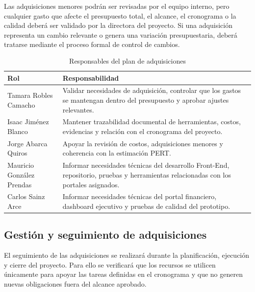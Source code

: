 \documentclass[11pt,spanish]{article}
\begin{document}
Las adquisiciones menores podrán ser revisadas por el equipo interno, pero cualquier gasto que afecte el presupuesto total, el alcance, el cronograma o la calidad deberá ser validado por la directora del proyecto. Si una adquisición representa un cambio relevante o genera una variación presupuestaria, deberá tratarse mediante el proceso formal de control de cambios.

\begin{table}[H]
\centering
\caption{Responsables del plan de adquisiciones}
\label{tab:responsables-adquisiciones}
{\small
\begin{tabularx}{\textwidth}{p{4cm} Y}
\toprule
\textbf{Rol} & \textbf{Responsabilidad} \\
\midrule
Tamara Robles Camacho & Validar necesidades de adquisición, controlar que los gastos se mantengan dentro del presupuesto y aprobar ajustes relevantes. \\
Isaac Jiménez Blanco & Mantener trazabilidad documental de herramientas, costos, evidencias y relación con el cronograma del proyecto. \\
Jorge Abarca Quiros & Apoyar la revisión de costos, adquisiciones menores y coherencia con la estimación PERT. \\
Mauricio González Prendas & Informar necesidades técnicas del desarrollo Front-End, repositorio, pruebas y herramientas relacionadas con los portales asignados. \\
Carlos Sainz Arce & Informar necesidades técnicas del portal financiero, dashboard ejecutivo y pruebas de calidad del prototipo. \\
\bottomrule
\end{tabularx}
}
\end{table}

\subsection{Gestión y seguimiento de adquisiciones}

El seguimiento de las adquisiciones se realizará durante la planificación, ejecución y cierre del proyecto. Para ello se verificará que los recursos se utilicen únicamente para apoyar las tareas definidas en el cronograma y que no generen nuevas obligaciones fuera del alcance aprobado.
\end{document}
